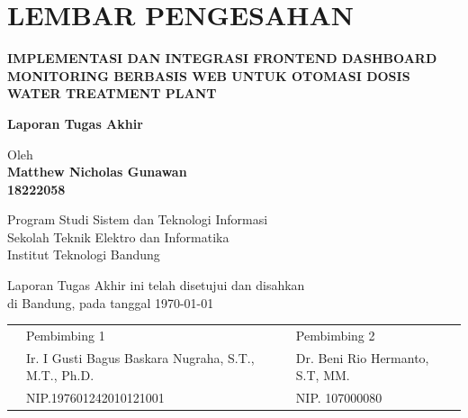 \chapter*{LEMBAR PENGESAHAN}


\begin{center}
    \vspace{1cm}
  {\large\bfseries IMPLEMENTASI DAN INTEGRASI FRONTEND DASHBOARD MONITORING BERBASIS WEB UNTUK OTOMASI DOSIS WATER TREATMENT PLANT}\\
     \vspace{1.2cm}

  {\Large \textbf{Laporan Tugas Akhir}}\\


  \vspace{1cm}

  {\large Oleh}\\[0.3cm]
    \textbf{
    {\large Matthew Nicholas Gunawan}\\
    {\large 18222058}
  }\\

  \vspace{0.5cm}

  {\large Program Studi Sistem dan Teknologi Informasi}\\
  {\large Sekolah Teknik Elektro dan Informatika}\\
  {\large Institut Teknologi Bandung}\\

  \vspace{1cm}

  Laporan Tugas Akhir ini telah disetujui dan disahkan\\
  di Bandung, pada tanggal \today\\[0.5cm]


\end{center}

\vspace{0.5cm}
\noindent


\begin{tabular}{p{1cm}p{7cm}p{7cm}}
  & Pembimbing 1 & Pembimbing 2 \\[1.5cm]
  & Ir. I Gusti Bagus Baskara Nugraha, S.T., M.T., Ph.D. & Dr. Beni Rio Hermanto, S.T, MM. \\[0.2cm]
  &  NIP.197601242010121001  & NIP. 107000080
 
\end{tabular}

